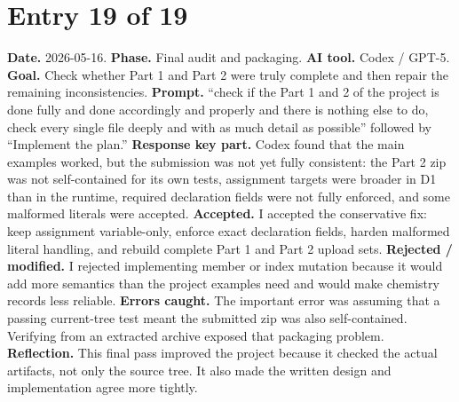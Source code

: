 \documentclass[11pt,a4paper]{article}
\begin{document}
\section*{Entry 19 of 19}
\textbf{Date.} 2026-05-16.
\textbf{Phase.} Final audit and packaging.
\textbf{AI tool.} Codex / GPT-5.
\textbf{Goal.} Check whether Part 1 and Part 2 were truly complete and then repair the remaining inconsistencies.
\textbf{Prompt.} ``check if the Part 1 and 2 of the project is done fully and done accordingly and properly and there is nothing else to do, check every single file deeply and with as much detail as possible'' followed by ``Implement the plan.''
\textbf{Response key part.} Codex found that the main examples worked, but the submission was not yet fully consistent: the Part 2 zip was not self-contained for its own tests, assignment targets were broader in D1 than in the runtime, required declaration fields were not fully enforced, and some malformed literals were accepted.
\textbf{Accepted.} I accepted the conservative fix: keep assignment variable-only, enforce exact declaration fields, harden malformed literal handling, and rebuild complete Part 1 and Part 2 upload sets.
\textbf{Rejected / modified.} I rejected implementing member or index mutation because it would add more semantics than the project examples need and would make chemistry records less reliable.
\textbf{Errors caught.} The important error was assuming that a passing current-tree test meant the submitted zip was also self-contained. Verifying from an extracted archive exposed that packaging problem.
\textbf{Reflection.} This final pass improved the project because it checked the actual artifacts, not only the source tree. It also made the written design and implementation agree more tightly.
\end{document}
